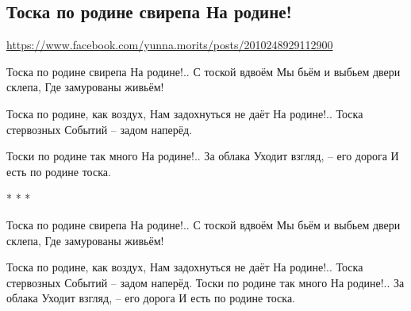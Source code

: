  
 
 
 
 

\subsection{Тоска по родине свирепа На родине!}
\url{https://www.facebook.com/yunna.morits/posts/2010248929112900}

Тоска по родине свирепа
На родине!.. С тоской вдвоём
Мы бьём и выбьем двери склепа,
Где замурованы живьём!

Тоска по родине, как воздух,
Нам задохнуться не даёт
На родине!.. Тоска стервозных
Событий – задом наперёд.

Тоски по родине так много
На родине!.. За облака
Уходит взгляд, – его дорога
И есть по родине тоска. 

* * *

Тоска по родине свирепа
На родине!.. С тоской вдвоём
Мы бьём и выбьем двери склепа,
Где замурованы живьём!

Тоска по родине, как воздух,
Нам задохнуться не даёт
На родине!.. Тоска стервозных
Событий – задом наперёд.
Тоски по родине так много
На родине!.. За облака
Уходит взгляд, – его дорога
И есть по родине тоска.
